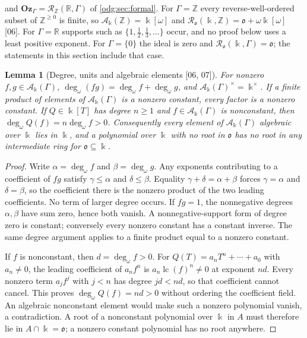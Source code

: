 \documentclass[11pt,oneside]{article}
\numberwithin{equation}{section}
\newtheorem{lemma}[lemma]{Lemma}
\theoremstyle{definition}
\theoremstyle{remark}
\newcommand{\Oz}{\mathbf{Oz}}
\newcommand{\Z}{\mathbb Z}
\newcommand{\R}{\mathbb R}
\newcommand{\lc}{\operatorname{lc}}
\newcommand{\ddeg}{\operatorname{deg}_{\omega}}
\newcommand{\src}[1]{\textup{\textsf{\small[#1]}}}
\begin{document}
and $\Oz_\Gamma=\mathcal R_\Z(\R,\Gamma)$ of \cref{odg:sec:formal}. For
$\Gamma=\Z$ every reverse-well-ordered subset of $\Z^{\ge0}$ is finite, so
$\mathcal A_\Bbbk(\Z)=\Bbbk[\omega]$ and
$\mathcal R_{\mathfrak o}(\Bbbk,\Z)=\mathfrak o+\omega\Bbbk[\omega]$ \src{06}.
For $\Gamma=\R$ supports such as $\{1,\frac12,\frac13,\ldots\}$ occur, and no
proof below uses a least positive exponent. For $\Gamma=\{0\}$ the ideal
is zero and $\mathcal R_{\mathfrak o}(\Bbbk,\Gamma)=\mathfrak o$; the
statements in this section include that case.

\begin{lemma}[Degree, units and algebraic elements \src{06, 07}]\label{odg:def:lem:units}
For nonzero $f,g\in\mathcal A_\Bbbk(\Gamma)$,
$\ddeg(fg)=\ddeg f+\ddeg g$, and $\mathcal A_\Bbbk(\Gamma)^\times=\Bbbk^\times$.
If a finite product of elements of $\mathcal A_\Bbbk(\Gamma)$ is a nonzero
constant, every factor is a nonzero constant. If $Q\in\Bbbk[T]$ has degree
$n\ge1$ and $f\in\mathcal A_\Bbbk(\Gamma)$ is nonconstant, then
$\ddeg Q(f)=n\ddeg f>0$. Consequently every element of
$\mathcal A_\Bbbk(\Gamma)$ algebraic over $\Bbbk$ lies in $\Bbbk$, and a
polynomial over $\Bbbk$ with no root in $\mathfrak o$ has no root in any
intermediate ring for $\mathfrak o\subseteq\Bbbk$.
\end{lemma}
\begin{proof}
Write $\alpha=\ddeg f$ and $\beta=\ddeg g$. Any exponents contributing to
a coefficient of $fg$ satisfy $\gamma\le\alpha$ and $\delta\le\beta$.
Equality $\gamma+\delta=\alpha+\beta$ forces $\gamma=\alpha$ and
$\delta=\beta$, so the coefficient there is the nonzero product of the two
leading coefficients. No term of larger degree occurs. If $fg=1$, the
nonnegative degrees $\alpha,\beta$ have sum zero, hence both vanish. A
nonnegative-support form of degree zero is constant; conversely every
nonzero constant has a constant inverse. The same degree argument applies
to a finite product equal to a nonzero constant.

If $f$ is nonconstant, then $d=\ddeg f>0$. For
$Q(T)=a_nT^n+\cdots+a_0$ with $a_n\ne0$, the leading coefficient of $a_nf^n$
is $a_n\lc(f)^n\ne0$ at exponent $nd$. Every nonzero term $a_jf^j$ with
$j<n$ has degree $jd<nd$, so that coefficient cannot cancel. This proves
$\ddeg Q(f)=nd>0$ without ordering the coefficient field. An algebraic
nonconstant element would make such a nonzero polynomial vanish, a
contradiction. A root of a nonconstant polynomial over $\Bbbk$ in $A$ must
therefore lie in $A\cap\Bbbk=\mathfrak o$; a nonzero constant polynomial has
no root anywhere.
\end{proof}
\end{document}
